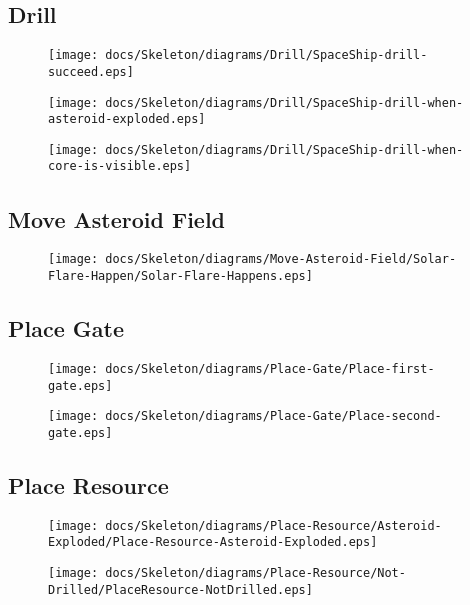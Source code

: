 
\subsection{Drill}

\begin{figure}[H] 
    \centering 
    \texttt{[image: docs/Skeleton/diagrams/Drill/SpaceShip-drill-succeed.eps]} 
    \caption{} 
\end{figure} 

\begin{figure}[H] 
    \centering 
    \texttt{[image: docs/Skeleton/diagrams/Drill/SpaceShip-drill-when-asteroid-exploded.eps]} 
    \caption{} 
\end{figure} 

\begin{figure}[H] 
    \centering 
    \texttt{[image: docs/Skeleton/diagrams/Drill/SpaceShip-drill-when-core-is-visible.eps]} 
    \caption{} 
\end{figure} 

\subsection{Move Asteroid Field}

\begin{figure}[H] 
    \centering 
    \texttt{[image: docs/Skeleton/diagrams/Move-Asteroid-Field/Solar-Flare-Happen/Solar-Flare-Happens.eps]} 
    \caption{} 
\end{figure} 

\subsection{Place Gate}

\begin{figure}[H] 
    \centering 
    \texttt{[image: docs/Skeleton/diagrams/Place-Gate/Place-first-gate.eps]} 
    \caption{} 
\end{figure} 

\begin{figure}[H] 
    \centering 
    \texttt{[image: docs/Skeleton/diagrams/Place-Gate/Place-second-gate.eps]} 
    \caption{} 
\end{figure} 



\subsection{Place Resource}

\begin{figure}[H] 
    \centering 
    \texttt{[image: docs/Skeleton/diagrams/Place-Resource/Asteroid-Exploded/Place-Resource-Asteroid-Exploded.eps]} 
    \caption{} 
\end{figure} 

\begin{figure}[H] 
    \centering 
    \texttt{[image: docs/Skeleton/diagrams/Place-Resource/Not-Drilled/PlaceResource-NotDrilled.eps]} 
    \caption{} 
\end{figure} 